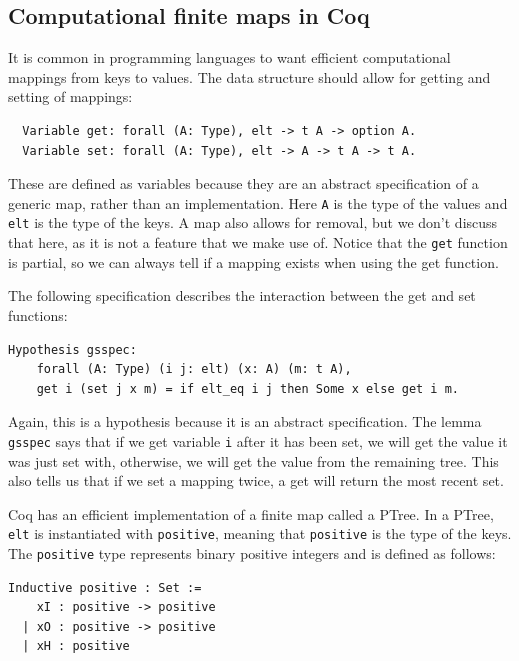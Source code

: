 \documentclass{puthesis}
\begin{document}
\subsection{Computational finite maps in Coq}

It is common in programming languages to want efficient computational
mappings from keys to values. The data structure should allow for
getting and setting of mappings:

\begin{lstlisting}
  Variable get: forall (A: Type), elt -> t A -> option A.
  Variable set: forall (A: Type), elt -> A -> t A -> t A.
\end{lstlisting}

These are defined as variables because they are an abstract
specification of a generic map, rather than an implementation. Here
\lstinline|A| is the type of the values and \lstinline|elt| is the
type of the keys. A map also allows for removal, but we
don't discuss that here, as it is not a feature that we make use
of. Notice that the \lstinline|get| function is partial, so we can
always tell if a mapping exists when using the get function.

The following specification describes the interaction between the get and
set functions:

\begin{lstlisting}
Hypothesis gsspec:
    forall (A: Type) (i j: elt) (x: A) (m: t A),
    get i (set j x m) = if elt_eq i j then Some x else get i m.
\end{lstlisting}

Again, this is a hypothesis because it is an abstract
specification. The lemma \lstinline|gsspec| says that if we get
variable \lstinline|i| after it has been set, we will get the value it
was just set with, otherwise, we will get the value from the remaining
tree. This also tells us that if we set a mapping twice, a get will
return the most recent set.

Coq has an efficient implementation of a finite map called a PTree. In
a PTree, \lstinline|elt| is instantiated with \lstinline|positive|,
meaning that \lstinline|positive| is the type of the keys. The
\lstinline|positive| type represents binary positive integers and is defined as follows:

\begin{lstlisting}
Inductive positive : Set :=
    xI : positive -> positive 
  | xO : positive -> positive 
  | xH : positive
\end{lstlisting}
\end{document}
